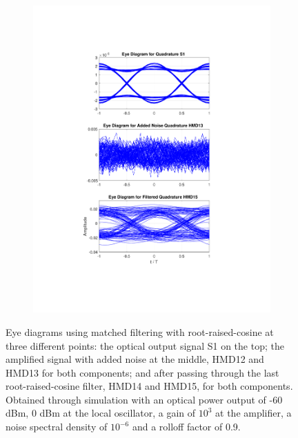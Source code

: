 \begin{figure}[H]
\begin{subfigure}{.45\textwidth}
		\includegraphics[clip, trim=5cm 4cm 5cm 4cm, width=\textwidth]{./sdf/m_qam_system/figures/eyes/q_p_60_09.pdf}
	\end{subfigure}
	
	\caption{Eye diagrams using matched filtering with root-raised-cosine at three different points: the optical output signal S1 on the top; the amplified signal with added noise at the middle, HMD12 and HMD13 for both components; and after passing through the last root-raised-cosine filter, HMD14 and HMD15, for both components. Obtained through simulation with an optical power output of -60 dBm, 0 dBm at the local oscillator, a gain of $10^3$ at the amplifier, a noise spectral density of $10^{-6}$ and a rolloff factor of 0.9.\label{fig:eyes_n_rrc_60_09}}
	
\end{figure}

